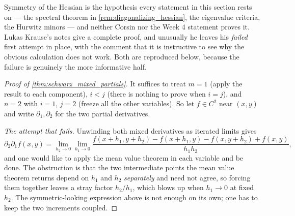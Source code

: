 \begin{ainote}
Symmetry of the Hessian is the hypothesis every statement in this section rests on --- the
spectral theorem in \cref{rem:diagonalizing_hessian}, the eigenvalue criteria, the Hurwitz
minors --- and neither Corsin nor the Week 4 statement proves it. Lukas Krause's notes give a
complete proof, and unusually he leaves his \emph{failed} first attempt in place, with the
comment that it is instructive to see why the obvious calculation does not work. Both are
reproduced below, because the failure is genuinely the more informative half.
\end{ainote}

\begin{proof}[Proof of \cref{thm:schwarz_mixed_partials}]
It suffices to treat $m=1$ (apply the result to each component), $i<j$ (there is nothing to
prove when $i=j$), and $n=2$ with $i=1$, $j=2$ (freeze all the other variables). So let
$f \in C^2$ near $(x,y)$ and write $\partial_1,\partial_2$ for the two partial derivatives.

\textit{The attempt that fails.} Unwinding both mixed derivatives as iterated limits gives
\[\partial_2\partial_1f(x,y)
  = \lim_{h_2\to0}\lim_{h_1\to0}
    \frac{f(x+h_1,y+h_2) - f(x+h_1,y) - f(x,y+h_2) + f(x,y)}{h_1h_2},\]
and one would like to apply the mean value theorem in each variable and be done. The obstruction
is that the two intermediate points the mean value theorem returns depend on $h_1$ and $h_2$
\emph{separately} and need not agree, so forcing them together leaves a stray factor
$h_2/h_1$, which blows up when $h_1 \to 0$ at fixed $h_2$. The symmetric-looking expression
above is not enough on its own; one has to keep the two increments coupled.


\end{proof}
